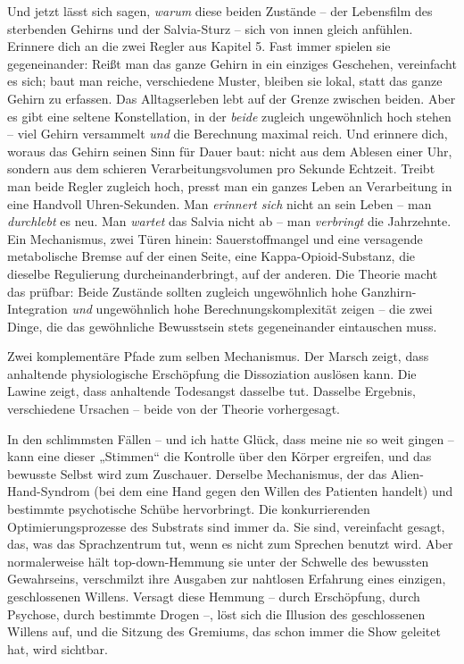 \documentclass[11pt, twoside, openright]{book}
\begin{document}
Und jetzt lässt sich sagen, \textit{warum} diese beiden Zustände -- der Lebensfilm des sterbenden Gehirns und der Salvia-Sturz -- sich von innen gleich anfühlen. Erinnere dich an die zwei Regler aus Kapitel 5. Fast immer spielen sie gegeneinander: Reißt man das ganze Gehirn in ein einziges Geschehen, vereinfacht es sich; baut man reiche, verschiedene Muster, bleiben sie lokal, statt das ganze Gehirn zu erfassen. Das Alltagserleben lebt auf der Grenze zwischen beiden. Aber es gibt eine seltene Konstellation, in der \textit{beide} zugleich ungewöhnlich hoch stehen -- viel Gehirn versammelt \textit{und} die Berechnung maximal reich. Und erinnere dich, woraus das Gehirn seinen Sinn für Dauer baut: nicht aus dem Ablesen einer Uhr, sondern aus dem schieren Verarbeitungsvolumen pro Sekunde Echtzeit. Treibt man beide Regler zugleich hoch, presst man ein ganzes Leben an Verarbeitung in eine Handvoll Uhren-Sekunden. Man \textit{erinnert sich} nicht an sein Leben -- man \textit{durchlebt} es neu. Man \textit{wartet} das Salvia nicht ab -- man \textit{verbringt} die Jahrzehnte. Ein Mechanismus, zwei Türen hinein: Sauerstoffmangel und eine versagende metabolische Bremse auf der einen Seite, eine Kappa-Opioid-Substanz, die dieselbe Regulierung durcheinanderbringt, auf der anderen. Die Theorie macht das prüfbar: Beide Zustände sollten zugleich ungewöhnlich hohe Ganzhirn-Integration \textit{und} ungewöhnlich hohe Berechnungskomplexität zeigen -- die zwei Dinge, die das gewöhnliche Bewusstsein stets gegeneinander eintauschen muss.

Zwei komplementäre Pfade zum selben Mechanismus. Der Marsch zeigt, dass anhaltende physiologische Erschöpfung die Dissoziation auslösen kann. Die Lawine zeigt, dass anhaltende Todesangst dasselbe tut. Dasselbe Ergebnis, verschiedene Ursachen -- beide von der Theorie vorhergesagt.

In den schlimmsten Fällen -- und ich hatte Glück, dass meine nie so weit gingen -- kann eine dieser „Stimmen“ die Kontrolle über den Körper ergreifen, und das bewusste Selbst wird zum Zuschauer. Derselbe Mechanismus, der das Alien-Hand-Syndrom (bei dem eine Hand gegen den Willen des Patienten handelt) und bestimmte psychotische Schübe hervorbringt. Die konkurrierenden Optimierungsprozesse des Substrats sind immer da. Sie sind, vereinfacht gesagt, das, was das Sprachzentrum tut, wenn es nicht zum Sprechen benutzt wird. Aber normalerweise hält top-down-Hemmung sie unter der Schwelle des bewussten Gewahrseins, verschmilzt ihre Ausgaben zur nahtlosen Erfahrung eines einzigen, geschlossenen Willens. Versagt diese Hemmung -- durch Erschöpfung, durch Psychose, durch bestimmte Drogen --, löst sich die Illusion des geschlossenen Willens auf, und die Sitzung des Gremiums, das schon immer die Show geleitet hat, wird sichtbar.
\end{document}
